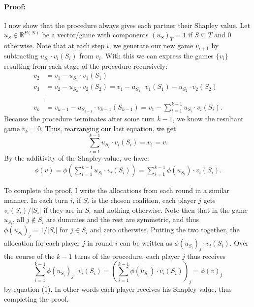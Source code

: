 \documentclass[12pt]{article}
\begin{document}
\paragraph{Proof:}
I now show that the procedure always gives each partner their Shapley value.
Let $u_S\in \mathbb{R}^{P(N)}$ be a vector/game with components $(u_S)_T = 1$ if
$S \subseteq T$ and 0 otherwise. Note that at each step $i$, we generate our
new game $v_{i+1}$ by subtracting $u_{S_i}\cdot v_i(S_i)$ from $v_{i}$.
With this we can express the games $\{v_i\}$
resulting from each stage of the procedure recursively:
\begin{align*}
  v_2 &= v_1 - u_{S_1}\cdot v_1(S_1)\\
  v_3 &= v_2 - u_{S_2}\cdot v_2(S_2) = v_1 - u_{S_1}\cdot v_1(S_1) - u_{S_2}\cdot
        v_2(S_2)\\
      & \vdots\\
  v_k &= v_{k-1} - u_{S_{k-1}}\cdot v_{k-1}(S_{k-1}) = v_1 - \sum_{i=1}^{k-1}
        u_{S_i}\cdot v_i(S_i).
\end{align*}
Because the procedure terminates after some turn $k-1$, we know the resultant
game $v_k = 0$. Thus, rearranging our last equation, we get
\begin{displaymath}
  \sum_{i=1}^{k-1}u_{S_i}\cdot v_i(S_i) = v_1 = v.
\end{displaymath}
By the additivity of the Shapley value, we have:
\begin{align}
  \phi(v) = \phi\left(\sum_{i=1}^{k-1}u_{S_i}\cdot v_i(S_i)\right) =
  \sum_{i=1}^{k-1}\phi(u_{S_i})\cdot v_i(S_i).
\end{align}

To complete the proof, I write the allocations from each round in a similar
manner. In each turn $i$, if $S_i$ is the chosen coalition, each player $j$
gets $v_i(S_i)/|S_i|$ if they are in $S_i$ and nothing otherwise. Note then that
in the game $u_{S_i}$, all $j\notin S_i$ are dummies and the rest are symmetric,
and thus $\phi(u_{S_i})_j = 1/|S_i|$ for $j\in S_i$ and zero otherwise. Putting
the two together, the allocation for each player $j$ in round $i$ can be written
as $\phi(u_{S_i})_j\cdot v_i(S_i)$. Over the course of the $k-1$ turns of the
procedure, each player $j$ thus receives
\begin{displaymath}
  \sum_{i=1}^{k-1}\phi(u_{S_i})_j\cdot v_i(S_i) = \left(\sum_{i=1}^{k-1}\phi(u_{S_i})
    \cdot v_i(S_i)\right)_j = \phi(v)_j
\end{displaymath}
by equation (1). In other words each player receives his Shapley value, thus
completing the proof.
\end{document}
